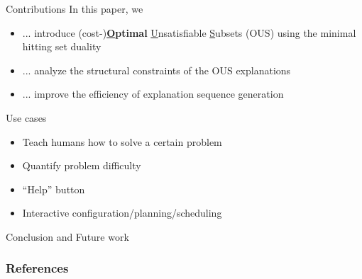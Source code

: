 \documentclass{beamer}
\begin{document}
\begin{frame}{Contributions}
    \vfill
    In this paper, we 
    \vfill
    \begin{itemize}
        \item ... introduce (cost-)\textbf{\underline{O}ptimal} \underline{U}nsatisfiable \underline{S}ubsets (OUS) using the minimal hitting set duality
        \item ... analyze the structural constraints of the OUS explanations
        \item ... improve the efficiency of explanation sequence generation
    \end{itemize}
    \vfill
\end{frame}

\begin{frame}{Use cases}
    \begin{itemize}
        \item Teach humans how to solve a certain problem
        \item Quantify problem difficulty
        \item ``Help'' button
        \item Interactive configuration/planning/scheduling
    \end{itemize}
\end{frame}

\begin{frame}{Conclusion and Future work}

\end{frame}

\begin{frame}[allowframebreaks]
	\frametitle{References}
	
	
\end{frame}
\end{document}
